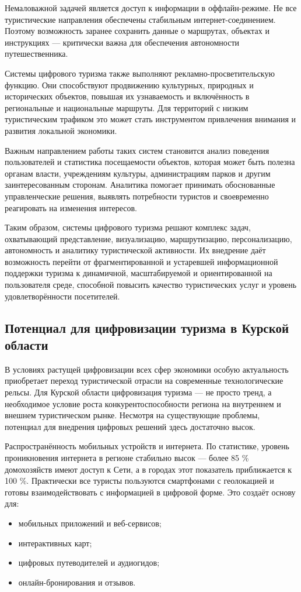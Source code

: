 Немаловажной задачей является доступ к информации в оффлайн-режиме. Не все туристические направления обеспечены стабильным интернет-соединением. Поэтому возможность заранее сохранить данные о маршрутах, объектах и инструкциях — критически важна для обеспечения автономности путешественника.

Системы цифрового туризма также выполняют рекламно-просветительскую функцию. Они способствуют продвижению культурных, природных и исторических объектов, повышая их узнаваемость и включённость в региональные и национальные маршруты. Для территорий с низким туристическим трафиком это может стать инструментом привлечения внимания и развития локальной экономики.

Важным направлением работы таких систем становится анализ поведения пользователей и статистика посещаемости объектов, которая может быть полезна органам власти, учреждениям культуры, администрациям парков и другим заинтересованным сторонам. Аналитика помогает принимать обоснованные управленческие решения, выявлять потребности туристов и своевременно реагировать на изменения интересов.

Таким образом, системы цифрового туризма решают комплекс задач, охватывающий представление, визуализацию, маршрутизацию, персонализацию, автономность и аналитику туристической активности. Их внедрение даёт возможность перейти от фрагментированной и устаревшей информационной поддержки туризма к динамичной, масштабируемой и ориентированной на пользователя среде, способной повысить качество туристических услуг и уровень удовлетворённости посетителей.

\subsection{Потенциал для цифровизации туризма в Курской области}

В условиях растущей цифровизации всех сфер экономики особую актуальность приобретает переход туристической отрасли на современные технологические рельсы. Для Курской области цифровизация туризма — не просто тренд, а необходимое условие роста конкурентоспособности региона на внутреннем и внешнем туристическом рынке. Несмотря на существующие проблемы, потенциал для внедрения цифровых решений здесь достаточно высок.

Распространённость мобильных устройств и интернета.
По статистике, уровень проникновения интернета в регионе стабильно высок — более 85 \% домохозяйств имеют доступ к Сети, а в городах этот показатель приближается к 100 \%. Практически все туристы пользуются смартфонами с геолокацией и готовы взаимодействовать с информацией в цифровой форме. Это создаёт основу для:
\begin{itemize}
	\item мобильных приложений и веб-сервисов;
	\item интерактивных карт;
	\item цифровых путеводителей и аудиогидов;
	\item онлайн-бронирования и отзывов.
\end{itemize}

